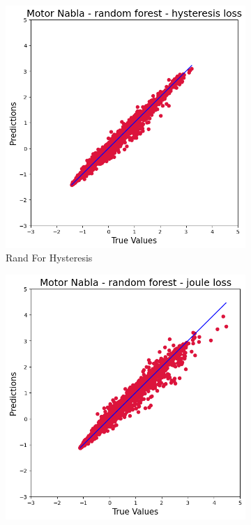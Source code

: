 \documentclass{article}
\begin{document}
\begin{figure}[!htbp]
    \begin{subfigure}[b]{0.23\textwidth}
        \centering
        \includegraphics[width=\textwidth]{images/Nabla/rand_for_hysteresis.png}
        \caption{Rand For Hysteresis}
    \end{subfigure}
    \hfill
    \begin{subfigure}[b]{0.23\textwidth}
        \centering
        \includegraphics[width=\textwidth]{images/Nabla/rand_for_joule.png}

\end{subfigure}
\end{figure}
\end{document}
